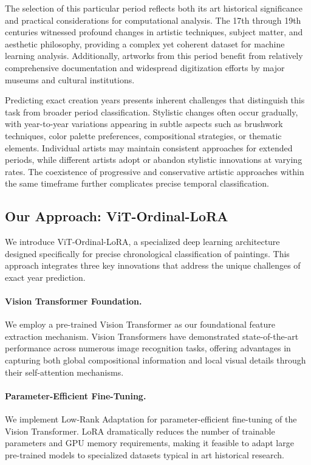 \documentclass[10pt,twocolumn,letterpaper]{article}
\begin{document}
The selection of this particular period reflects both its art historical significance and practical considerations for computational analysis. The 17th through 19th centuries witnessed profound changes in artistic techniques, subject matter, and aesthetic philosophy, providing a complex yet coherent dataset for machine learning analysis. Additionally, artworks from this period benefit from relatively comprehensive documentation and widespread digitization efforts by major museums and cultural institutions.

Predicting exact creation years presents inherent challenges that distinguish this task from broader period classification. Stylistic changes often occur gradually, with year-to-year variations appearing in subtle aspects such as brushwork techniques, color palette preferences, compositional strategies, or thematic elements. Individual artists may maintain consistent approaches for extended periods, while different artists adopt or abandon stylistic innovations at varying rates. The coexistence of progressive and conservative artistic approaches within the same timeframe further complicates precise temporal classification.

\subsection{Our Approach: ViT-Ordinal-LoRA}

We introduce ViT-Ordinal-LoRA, a specialized deep learning architecture designed specifically for precise chronological classification of paintings. This approach integrates three key innovations that address the unique challenges of exact year prediction.

\paragraph{Vision Transformer Foundation.} We employ a pre-trained Vision Transformer \cite{Dosovitskiy20ViT} as our foundational feature extraction mechanism. Vision Transformers have demonstrated state-of-the-art performance across numerous image recognition tasks, offering advantages in capturing both global compositional information and local visual details through their self-attention mechanisms.

\paragraph{Parameter-Efficient Fine-Tuning.} We implement Low-Rank Adaptation \cite{Hu21LoRA} for parameter-efficient fine-tuning of the Vision Transformer. LoRA dramatically reduces the number of trainable parameters and GPU memory requirements, making it feasible to adapt large pre-trained models to specialized datasets typical in art historical research.
\end{document}
